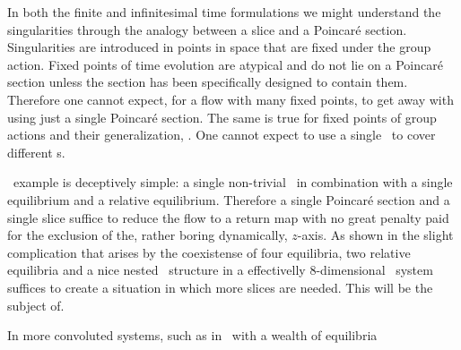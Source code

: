

In both the finite and infinitesimal time formulations we might
understand the singularities through the analogy between a slice
and a Poincar\'e section. Singularities are introduced in points
in space that are fixed under the group action. Fixed points of time 
evolution are atypical and do not lie on a Poincar\'e section 
unless the section has been specifically designed to contain them.
Therefore one cannot expect, for a flow with many fixed points, to
get away with using just a single Poincar\'e section. The same is
true for fixed points of group actions and their generalization, \fixedsp.
One cannot expect to use a single \slice\ to cover different \fixedsp s.

\CLe\ example is deceptively simple: a single non-trivial \fixedsp\ in combination
with a single equilibrium and a relative equilibrium. Therefore a single Poincar\'e
section and a single slice suffice to reduce the flow to a return map with no
great penalty paid for the exclusion of the, rather boring dynamically, $z$-axis. 
As shown in  the slight complication that arises by the
coexistense of four equilibria, two relative equilibria and a nice nested \fixedsp\
structure in a effectivelly $8$-dimensional \KS\ system 
suffices to create a situation in which more slices are needed. This will
be the subject of.

In more convoluted systems, such as in \KSe\ with a wealth of equilibria 